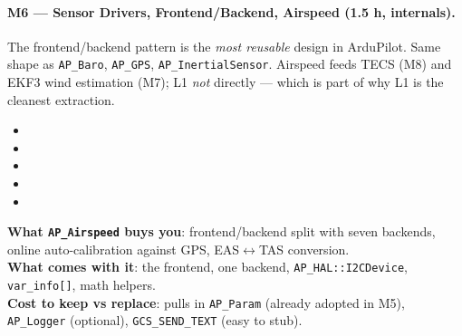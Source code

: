 \documentclass[a4paper,11pt,twoside]{article}
\renewcommand{\adoptionsidebar}[1]{\begin{tcolorbox}[colback=cyan!4!white,colframe=cyan!50!black,title=Adoption side-bar,breakable]#1\end{tcolorbox}}
\begin{document}
\paragraph{M6 --- Sensor Drivers, Frontend/Backend, Airspeed (1.5 h, internals).}
The frontend/backend pattern is the \emph{most reusable} design in ArduPilot. Same shape as \texttt{AP\_Baro}, \texttt{AP\_GPS}, \texttt{AP\_InertialSensor}. Airspeed feeds TECS (M8) and EKF3 wind estimation (M7); L1 \emph{not} directly --- which is part of why L1 is the cleanest extraction.
\begin{itemize}
  \item {}
  \item {}
  \item {}
  \item {}
  \item {}
\end{itemize}

\adoptionsidebar{
\textbf{What \texttt{AP\_Airspeed} buys you}: frontend/backend split with seven backends, online auto-calibration against GPS, EAS$\leftrightarrow$TAS conversion.\\
\textbf{What comes with it}: the frontend, one backend, \texttt{AP\_HAL::I2CDevice}, \texttt{var\_info[]}, math helpers.\\
\textbf{Cost to keep vs replace}: pulls in \texttt{AP\_Param} (already adopted in M5), \texttt{AP\_Logger} (optional), \texttt{GCS\_SEND\_TEXT} (easy to stub).}
\end{document}
